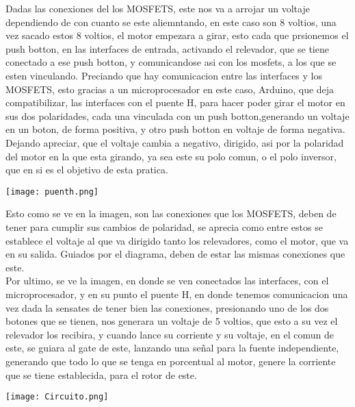 \documentclass[12pt,a4paper]{article}
\begin{document}
{Dadas las conexiones del los MOSFETS, este nos va a arrojar un voltaje dependiendo de con cuanto se este aliemntando, en este caso son 8 voltios, una vez sacado estos 8 voltios, el motor empezara a girar, esto cada que prsionemos el push botton, en las interfaces de entrada, activando el relevador, que se tiene conectado a ese push botton, y comunicandose asi con los mosfets, a los que se esten vinculando. Preciando que hay comunicacion entre las interfaces y los MOSFETS, esto gracias a un microprocesador en este caso, Arduino, que deja compatibilizar, las interfaces con el puente H, para hacer poder girar el motor en sus dos polaridades, cada una vinculada con un push botton,generando un voltaje en un boton, de forma positiva, y otro push botton en voltaje de forma negativa.\\

Dejando apreciar, que el voltaje cambia a negativo, dirigido, asi por la polaridad del motor en la que esta girando, ya sea este su polo comun, o el polo inversor, que en si es el objetivo de esta pratica.\\

\begin{center}
\texttt{[image: puenth.png]} 
\end{center}

Esto como se ve en la imagen, son las conexiones que los MOSFETS, deben de tener para cumplir sus cambios de polaridad, se aprecia como entre estos se establece el voltaje al que va dirigido tanto los relevadores, como el motor, que va en su salida. Guiados por el diagrama, deben de estar las mismas conexiones que este.\\

Por ultimo, se ve la imagen, en donde se ven conectados las interfaces, con el microprocesador, y en su punto el puente H, en donde tenemos comunicacion una vez dada la sensates de tener bien las conexiones, presionando uno de los dos botones que se tienen, nos generara un voltaje de 5 voltios, que esto a su vez el relevador los recibira, y cuando lance su corriente y su voltaje, en el comun de este, se guiara al gate de este, lanzando una señal para la fuente independiente, generando que todo lo que se tenga en porcentual al motor, genere la corriente que se tiene establecida, para el rotor de este.\\

\begin{center}
\texttt{[image: Circuito.png]} 
\end{center}

}
\end{document}

